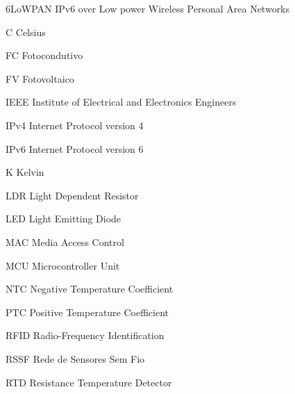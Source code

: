 \begin{siglas}
\item [6LoWPAN] IPv6 over Low power Wireless Personal Area Networks
\item [C]	Celsius
\item [FC]	Fotocondutivo
\item [FV]	Fotovoltaico
\item [IEEE]	Institute of Electrical and Electronics Engineers
\item [IPv4]	Internet Protocol version 4
\item [IPv6]	Internet Protocol version 6
\item [K]	Kelvin
\item [LDR]	Light Dependent Resistor
\item [LED]	Light Emitting Diode
\item [MAC]	Media Access Control
\item [MCU]	Microcontroller Unit
\item [NTC]	Negative Temperature Coefficient
\item [PTC]	Positive Temperature Coefficient
\item [RFID]	Radio-Frequency Identification
\item [RSSF]	Rede de Sensores Sem Fio
\item [RTD]	Resistance Temperature Detector
\end{siglas}
